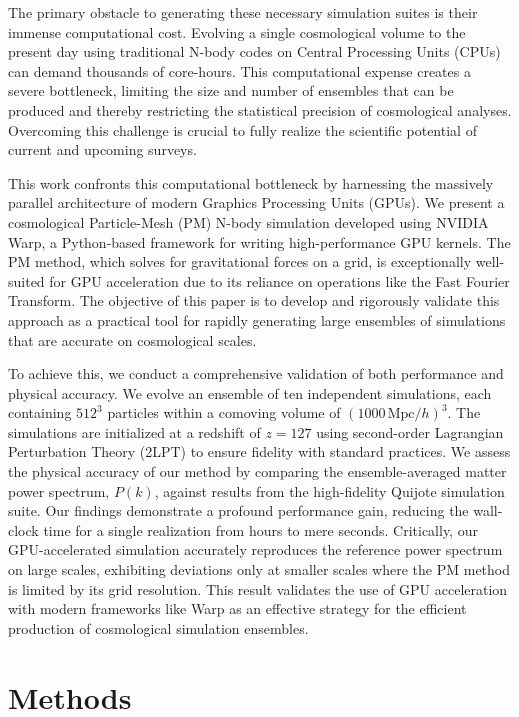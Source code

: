 \documentclass[]{article}
\begin{document}
The primary obstacle to generating these necessary simulation suites is their immense computational cost. Evolving a single cosmological volume to the present day using traditional N-body codes on Central Processing Units (CPUs) can demand thousands of core-hours. This computational expense creates a severe bottleneck, limiting the size and number of ensembles that can be produced and thereby restricting the statistical precision of cosmological analyses. Overcoming this challenge is crucial to fully realize the scientific potential of current and upcoming surveys.

This work confronts this computational bottleneck by harnessing the massively parallel architecture of modern Graphics Processing Units (GPUs). We present a cosmological Particle-Mesh (PM) N-body simulation developed using NVIDIA Warp, a Python-based framework for writing high-performance GPU kernels. The PM method, which solves for gravitational forces on a grid, is exceptionally well-suited for GPU acceleration due to its reliance on operations like the Fast Fourier Transform. The objective of this paper is to develop and rigorously validate this approach as a practical tool for rapidly generating large ensembles of simulations that are accurate on cosmological scales.

To achieve this, we conduct a comprehensive validation of both performance and physical accuracy. We evolve an ensemble of ten independent simulations, each containing $512^3$ particles within a comoving volume of $(1000 \, \text{Mpc}/h)^3$. The simulations are initialized at a redshift of $z=127$ using second-order Lagrangian Perturbation Theory (2LPT) to ensure fidelity with standard practices. We assess the physical accuracy of our method by comparing the ensemble-averaged matter power spectrum, $P(k)$, against results from the high-fidelity Quijote simulation suite. Our findings demonstrate a profound performance gain, reducing the wall-clock time for a single realization from hours to mere seconds. Critically, our GPU-accelerated simulation accurately reproduces the reference power spectrum on large scales, exhibiting deviations only at smaller scales where the PM method is limited by its grid resolution. This result validates the use of GPU acceleration with modern frameworks like Warp as an effective strategy for the efficient production of cosmological simulation ensembles.

\section{Methods}
\label{sec:methods}
\end{document}
